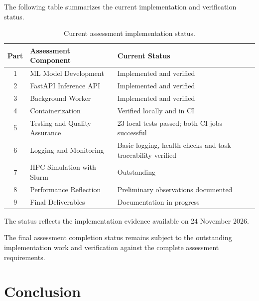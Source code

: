 \documentclass[11pt,a4paper]{article}
\begin{document}
The following table summarizes the current
implementation and verification status.

\begin{table}[H]
\centering
\small
\begin{tabularx}{\linewidth}{@{}cXX@{}}
\toprule
\textbf{Part} &
\textbf{Assessment Component} &
\textbf{Current Status}\\
\midrule

1 &
ML Model Development &
Implemented and verified\\

2 &
FastAPI Inference API &
Implemented and verified\\

3 &
Background Worker &
Implemented and verified\\

4 &
Containerization &
Verified locally and in CI\\

5 &
Testing and Quality Assurance &
23 local tests passed; both CI jobs successful\\

6 &
Logging and Monitoring &
Basic logging, health checks and task traceability verified\\

7 &
HPC Simulation with Slurm &
Outstanding\\

8 &
Performance Reflection &
Preliminary observations documented\\

9 &
Final Deliverables &
Documentation in progress\\

\bottomrule
\end{tabularx}
\caption{Current assessment implementation status.}
\end{table}

The status reflects the implementation evidence
available on 24 November 2026.

The final assessment completion status remains
subject to the outstanding implementation work
and verification against the complete assessment
requirements.


\section{Conclusion}
\end{document}
